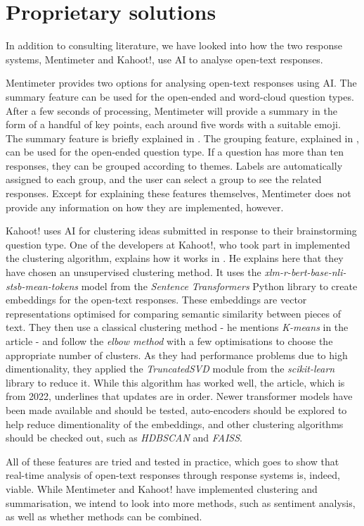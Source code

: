 \section{Proprietary solutions}
In addition to consulting literature, we have looked into how the two response systems, Mentimeter and Kahoot!, use AI to analyse open-text responses.

Mentimeter provides two options for analysing open-text responses using AI. The summary feature can be used for the open-ended and word-cloud question types. After a few seconds of processing, Mentimeter will provide a summary in the form of a handful of key points, each around five words with a suitable emoji. The summary feature is briefly explained in \cite{mentisummary}. The grouping feature, explained in \cite{mentigrouping}, can be used for the open-ended question type. If a question has more than ten responses, they can be grouped according to themes. Labels are automatically assigned to each group, and the user can select a group to see the related responses. Except for explaining these features themselves, Mentimeter does not provide any information on how they are implemented, however.

Kahoot! uses AI for clustering ideas submitted in response to their brainstorming question type. One of the developers at Kahoot!, who took part in implemented the clustering algorithm, explains how it works in \cite{kahootclustering}. He explains here that they have chosen an unsupervised clustering method. It uses the \textit{xlm-r-bert-base-nli-stsb-mean-tokens} model from the \textit{Sentence Transformers} Python library to create embeddings for the open-text responses. These embeddings are vector representations optimised for comparing semantic similarity between pieces of text. They then use a classical clustering method - he mentions \textit{K-means} in the article - and follow the \textit{elbow method} with a few optimisations to choose the appropriate number of clusters. As they had performance problems due to high dimentionality, they applied the \textit{TruncatedSVD} module from the \textit{scikit-learn} library to reduce it. While this algorithm has worked well, the article, which is from 2022, underlines that updates are in order. Newer transformer models have been made available and should be tested, auto-encoders should be explored to help reduce dimentionality of the embeddings, and other clustering algorithms should be checked out, such as \textit{HDBSCAN} and \textit{FAISS}.

All of these features are tried and tested in practice, which goes to show that real-time analysis of open-text responses through response systems is, indeed, viable. While Mentimeter and Kahoot! have implemented clustering and summarisation, we intend to look into more methods, such as sentiment analysis, as well as whether methods can be combined.

